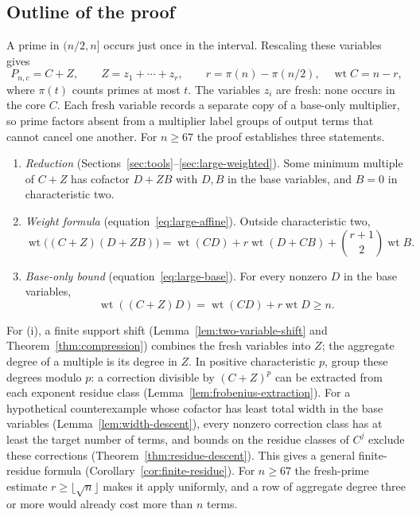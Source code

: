 \documentclass[11pt]{article}
\DeclareMathOperator{\wt}{wt}\DeclareMathOperator{\ord}{ord}
\numberwithin{equation}{section}
\theoremstyle{definition}\newtheorem{definition}[theorem]{Definition}
\theoremstyle{remark}\newtheorem{remark}[theorem]{Remark}
\begin{document}
\subsection*{Outline of the proof}

A prime in $(n/2,n]$ occurs just once in the interval. Rescaling
these variables gives
\[
 P_{n,c}=C+Z,\qquad Z=z_1+\cdots+z_r,\qquad
 r=\pi(n)-\pi(n/2),\quad \wt C=n-r,
\]
where $\pi(t)$ counts primes at most $t$. The variables $z_i$
are fresh: none occurs in the core $C$. Each fresh variable records a
separate copy of a base-only multiplier, so prime factors absent from a
multiplier label groups of output terms that cannot cancel one another.
For $n\ge67$ the proof establishes three statements.

\begin{enumerate}[label=\textup{(\roman*)},leftmargin=2.2em]
\item \emph{Reduction} (Sections~\ref{sec:tools}--\ref{sec:large-weighted}). Some minimum multiple of $C+Z$ has
cofactor $D+ZB$ with $D,B$ in the base variables, and $B=0$ in
characteristic two.
\item \emph{Weight formula} (equation~\eqref{eq:large-affine}). Outside
characteristic two,
\[
 \wt\bigl((C+Z)(D+ZB)\bigr)=\wt(CD)+r\wt(D+CB)+\binom{r+1}{2}\wt B.
\]
\item \emph{Base-only bound} (equation~\eqref{eq:large-base}). For every
nonzero $D$ in the base variables,
\begin{equation}\label{eq:intro-base}
 \wt((C+Z)D)=\wt(CD)+r\wt D\ge n.
\end{equation}
\end{enumerate}

For (i), a finite support shift (Lemma~\ref{lem:two-variable-shift} and
Theorem~\ref{thm:compression}) combines the fresh variables into $Z$;
the aggregate degree of a multiple is its degree in $Z$. In positive
characteristic $p$, group these degrees modulo $p$: a correction
divisible by $(C+Z)^p$ can be extracted from each exponent residue class
(Lemma~\ref{lem:frobenius-extraction}). For a hypothetical counterexample
whose cofactor has least total width in the base variables
(Lemma~\ref{lem:width-descent}), every nonzero correction class has at
least the target number of terms, and bounds on the residue classes of
$C^j$ exclude these corrections (Theorem~\ref{thm:residue-descent}).
This gives a general finite-residue formula
(Corollary~\ref{cor:finite-residue}). For $n\ge67$ the fresh-prime
estimate $r\ge\lfloor\sqrt n\rfloor$ makes it apply uniformly, and a row of
aggregate degree three or more would already cost more than $n$ terms.
\end{document}
